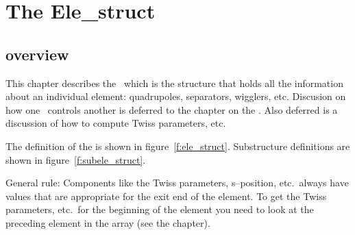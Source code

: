 \chapter{The Ele\_struct}
\section{overview}

This chapter describes the \elestruct\ which is the structure that
holds all the information about an individual element: quadrupoles,
separators, wigglers, etc. Discusion on how one \elestruct\ controls
another is deferred to the chapter on the \ringstruct. Also deferred
is a discussion of how to compute Twiss parameters, etc.

The definition of the \elestruct is shown
in figure~\ref{f:ele_struct}. Substructure definitions are shown in
figure~\ref{f:subele_struct}. 

General rule: Components like the Twiss parameters, s--position, etc.\
always have values that are appropriate for the exit end of the element. To
get the Twiss parameters, etc.\ for the beginning of the element you
need to look at the preceding element in the \vn{ring\%ele\_(:)} array
(see the \ringstruct chapter).


